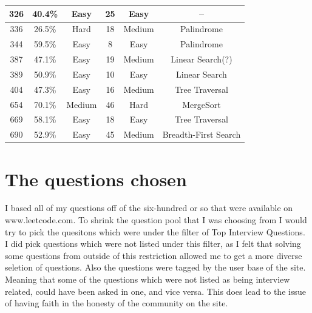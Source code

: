 \documentclass[10pt,twocolumn]{IEEEtran}
\begin{document}
\begin{table}[h!]
\begin{tabular}{||c c c c c c||}
  \hline
 326 & 40.4\% &Easy  &25  &Easy&--\\
   \hline
  336 & 26.5\% &Hard &18  &Medium&Palindrome\\
  \hline
 344 & 59.5\% &Easy  &8  &Easy&Palindrome\\
  \hline
 387 & 47.1\% &Easy  & 19 &Medium&Linear Search(?)\\
  \hline
 389 & 50.9\% &Easy  & 10 &Easy&Linear Search\\
  \hline
 404 & 47.3\% &Easy  &16  &Medium&Tree Traversal\\
  \hline
 654 & 70.1\% &Medium  &46  &Hard&MergeSort\\
  \hline
 669 &  58.1\%& Easy &18  &Easy&Tree Traversal\\
  \hline
 690 &  52.9\%& Easy &   45&Medium&Breadth-First Search\\[1ex]
 \hline
\end{tabular}
\label{table:tab}
\end{table}

%
%
 
 

\section{The questions chosen}
I based all of my questions off of the six-hundred or so that were available on www.leetcode.com\cite{leet1}. To shrink the question pool that I was choosing from I would try to pick the quesitons which were under the filter of Top Interview Questions. I did pick questions which were not listed under this filter, as I felt that solving some questions from outside of this restriction allowed me to get a more diverse seletion of questions. Also the questions were tagged by the user base of the site. Meaning that some of the questions which were not listed as being interview related, could have been asked in one, and vice versa. This does lead to the issue of having faith in the honesty of the community on the site.  
\end{document}
